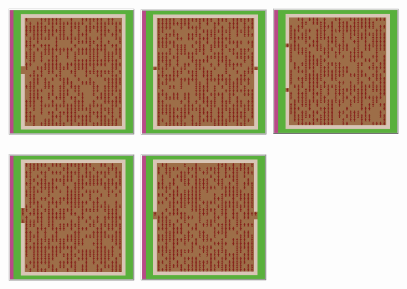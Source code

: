 \documentclass[12pt,letterpaper]{article}
\begin{document}
\begin{figure}[ht]
  \centering
  \begin{minipage}[b]{.75\linewidth}
    \includegraphics[width=0.3\textwidth]{./figures/exit_dims_2_a.png}
    \includegraphics[width=0.3\textwidth]{./figures/exit_dims_2_b.png}
    \includegraphics[width=0.3\textwidth]{./figures/exit_dims_2_c.png}
  \end{minipage}
  \begin{minipage}[b]{.75\linewidth}
    \includegraphics[width=0.3\textwidth]{./figures/exit_dims_4_a.png}
    \includegraphics[width=0.3\textwidth]{./figures/exit_dims_4_b.png}

\end{minipage}
\end{figure}
\end{document}
